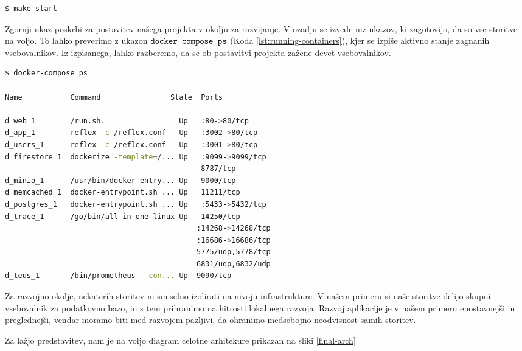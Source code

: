 \documentclass[a4paper, 12pt]{book}
\begin{document}
\begin{lstlisting}[language=bash,style=mystyle]
$ make start
\end{lstlisting}

Zgornji ukaz poskrbi za postavitev našega projekta v okolju za razvijanje. V ozadju se izvede niz ukazov, ki zagotovijo, da so vse storitve na voljo. To lahko preverimo z ukazon $\verb=docker-compose ps=$ (Koda \ref{lst:running-containers}), kjer se izpiše aktivno stanje zagnanih vsebovalnikov. Iz izpisanega, lahko razberemo, da se ob postavitvi projekta zažene devet vsebovalnikov.  

\begin{lstlisting}[language=bash,style=mystyle,caption={Prikaz zagnanih vsebovalnikov},label=lst:running-containers]
$ docker-compose ps

Name           Command                State  Ports
------------------------------------------------------------
d_web_1        /run.sh.                 Up   :80->80/tcp
d_app_1        reflex -c /reflex.conf   Up   :3002->80/tcp
d_users_1      reflex -c /reflex.conf   Up   :3001->80/tcp 
d_firestore_1  dockerize -template=/... Up   :9099->9099/tcp             
                                             8787/tcp
d_minio_1      /usr/bin/docker-entry... Up   9000/tcp     
d_memcached_1  docker-entrypoint.sh ... Up   11211/tcp     
d_postgres_1   docker-entrypoint.sh ... Up   :5433->5432/tcp       
d_trace_1      /go/bin/all-in-one-linux Up   14250/tcp 
                                            :14268->14268/tcp
                                            :16686->16686/tcp
                                            5775/udp,5778/tcp 
                                            6831/udp,6832/udp   
d_teus_1       /bin/prometheus --con... Up  9090/tcp     
\end{lstlisting}

Za razvojno okolje, nekaterih storitev ni smiselno izolirati na nivoju infrastrukture. V našem primeru si naše storitve delijo skupni vsebovalnik za podatkovno bazo, in s tem prihranimo na hitrosti lokalnega razvoja. Razvoj aplikacije je v našem primeru enostavnejši in preglednejši, vendar moramo biti med razvojem pazljivi, da ohranimo medsebojno neodvisnost samih storitev. 

Za lažjo predstavitev, nam je na voljo diagram celotne arhitekure prikazan na sliki \ref{final-arch}
\end{document}
